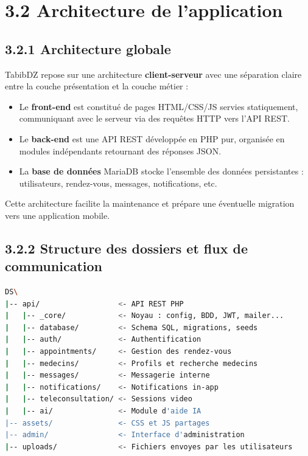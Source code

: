 \documentclass[12pt,a4paper]{report}
\begin{document}
\section*{3.2 Architecture de l'application}

\subsection*{3.2.1 Architecture globale}

TabibDZ repose sur une architecture \textbf{client-serveur} avec une s\'eparation claire entre la couche pr\'esentation et la couche m\'etier :

\begin{itemize}
    \item Le \textbf{front-end} est constitu\'e de pages HTML/CSS/JS servies statiquement, communiquant avec le serveur via des requ\^etes HTTP vers l'API REST.
    \item Le \textbf{back-end} est une API REST d\'evelopp\'ee en PHP pur, organis\'ee en modules ind\'ependants retournant des r\'eponses JSON.
    \item La \textbf{base de donn\'ees} MariaDB stocke l'ensemble des donn\'ees persistantes : utilisateurs, rendez-vous, messages, notifications, etc.
\end{itemize}

Cette architecture facilite la maintenance et pr\'epare une \'eventuelle migration vers une application mobile.

\subsection*{3.2.2 Structure des dossiers et flux de communication}

\begin{lstlisting}[language=bash, caption={Structure des dossiers du projet TabibDZ}]
DS\
|-- api/                  <- API REST PHP
|   |-- _core/            <- Noyau : config, BDD, JWT, mailer...
|   |-- database/         <- Schema SQL, migrations, seeds
|   |-- auth/             <- Authentification
|   |-- appointments/     <- Gestion des rendez-vous
|   |-- medecins/         <- Profils et recherche medecins
|   |-- messages/         <- Messagerie interne
|   |-- notifications/    <- Notifications in-app
|   |-- teleconsultation/ <- Sessions video
|   |-- ai/               <- Module d'aide IA
|-- assets/               <- CSS et JS partages
|-- admin/                <- Interface d'administration
|-- uploads/              <- Fichiers envoyes par les utilisateurs
\end{lstlisting}
\end{document}
